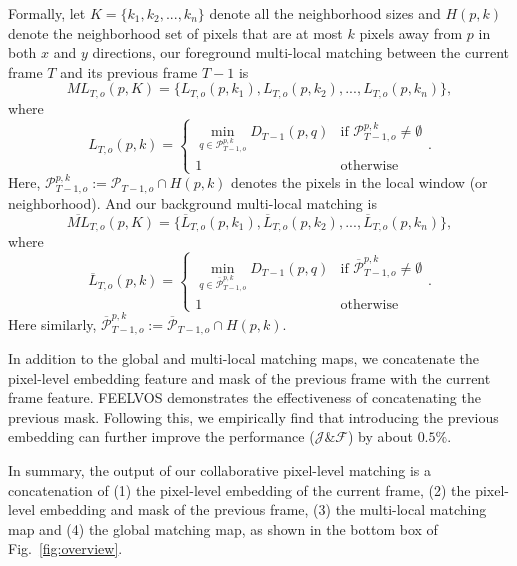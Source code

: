 \documentclass[runningheads]{llncs}
\begin{document}
Formally, let $K=\{k_1,k_2,...,k_n\}$ denote all the neighborhood sizes and $H(p,k)$ denote the neighborhood set of pixels that are at most $k$ pixels away from $p$ in both $x$ and $y$ directions, our foreground multi-local matching between the current frame $T$ and its previous frame $T-1$ is
\begin{equation} 
    ML_{T,o}(p,K)=\{L_{T,o}(p,k_1),L_{T,o}(p,k_2),...,L_{T,o}(p,k_n)\},
\end{equation}
where
\begin{equation} \label{equ:local_f}
    L_{T,o}(p,k)=
        \begin{cases}
            \min_{q\in\mathcal{P}^{p,k}_{T-1,o}} D_{T-1}(p,q) & \text{if }\mathcal{P}^{p,k}_{T-1,o}\neq\emptyset \\
            1 & \text{otherwise}
        \end{cases}.
\end{equation}
Here, $\mathcal{P}^{p,k}_{T-1,o}:=\mathcal{P}_{T-1,o}\cap H(p,k)$ denotes the pixels in the local window (or neighborhood). And our background multi-local matching is
\begin{equation} 
    \overline{ML}_{T,o}(p,K)=\{\overline{L}_{T,o}(p,k_1),\overline{L}_{T,o}(p,k_2),...,\overline{L}_{T,o}(p,k_n)\},
\end{equation}
where
\begin{equation} \label{equ:local_b}
    \overline{L}_{T,o}(p,k)=
        \begin{cases}
            \min_{q\in\mathcal{\overline{P}}_{T-1,o}^{p,k}} D_{T-1}(p,q) & \text{if }\mathcal{\overline{P}}_{T-1,o}^{p,k}\neq\emptyset \\
            1 & \text{otherwise}
        \end{cases}.
\end{equation}
Here similarly, $\mathcal{\overline{P}}^{p,k}_{T-1,o}:=\mathcal{\overline{P}}_{T-1,o}\cap H(p,k)$.


In addition to the global and multi-local matching maps, we concatenate the pixel-level embedding feature and mask of the previous frame with the current frame feature. FEELVOS demonstrates the effectiveness of concatenating the previous mask. Following this, we empirically find that introducing the previous embedding can further improve the performance ($\mathcal{J}$\&$\mathcal{F}$) by about $0.5\%$.

In summary, the output of our collaborative pixel-level matching is a concatenation of (1) the pixel-level embedding of the current frame, (2) the pixel-level embedding and mask of the previous frame, (3) the multi-local matching map and (4) the global matching map, as shown in the bottom box of Fig.~\ref{fig:overview}. 
\end{document}
